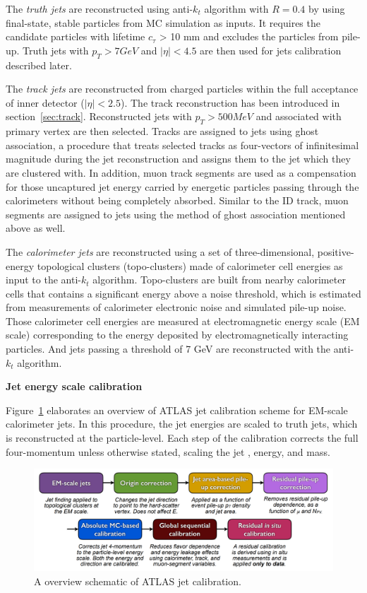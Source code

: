 The \textit{truth jets} are reconstructed using anti-$k_{t}$ algorithm with $R = 0.4$ by using final-state, stable particles from MC simulation as inputs.
It requires the candidate particles with lifetime $c_{\tau}$ > 10 mm and excludes the particles from pile-up.
Truth jets with $p_{T} > 7 GeV$ and $|\eta| < 4.5$ are then used for jets calibration described later.

The \textit{track jets} are reconstructed from charged particles within the full acceptance of inner detector ($|\eta| < 2.5$).
The track reconstruction has been introduced in section~\ref{sec:track}.
Reconstructed jets with $p_{T} > 500 MeV$ and associated with primary vertex are then selected.
Tracks are assigned to jets using ghost association\cite{CACCIARI2008119}, a procedure that treats selected tracks as four-vectors of infinitesimal magnitude during the jet reconstruction and assigns them to the jet which they are clustered with.
In addition, muon track segments are used as a compensation for those uncaptured jet energy carried by energetic particles passing through the calorimeters without being completely absorbed.
Similar to the ID track, muon segments are assigned to jets using the method of ghost association mentioned above as well.

The \textit{calorimeter jets} are reconstructed using a set of three-dimensional, positive-energy topological clusters (topo-clusters) made of calorimeter cell energies as input to the anti-$k_{t}$ algorithm\cite{Aaboud:2017jcu}.
Topo-clusters are built from nearby calorimeter cells that contains a significant energy above a noise threshold,
which is estimated from measurements of calorimeter electronic noise and simulated pile-up noise.
Those calorimeter cell energies are measured at electromagnetic energy scale (EM scale) corresponding to the energy deposited by electromagnetically interacting particles. 
And jets passing a \pt threshold of 7 GeV are reconstructed with the anti-$k_{t}$ algorithm.

\textbf{Jet energy scale calibration}

Figure~\ref{fig:jet_cali} elaborates an overview of ATLAS jet calibration scheme for EM-scale calorimeter jets.
In this procedure, the jet energies are scaled to truth jets, which is reconstructed at the particle-level.
Each step of the calibration corrects the full four-momentum unless otherwise stated, scaling the jet \pt, energy, and mass.
\begin{figure}[!htb]
  \centering
  \includegraphics[width=1.0\textwidth]{figures/Simulation/jet_calibration.png}
  \caption{A overview schematic of ATLAS jet calibration\cite{Aaboud:2017jcu}.}
  \label{fig:jet_cali}
\end{figure}

